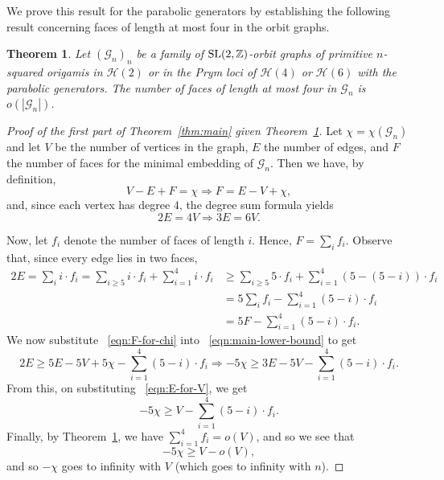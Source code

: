 \documentclass[a4paper,11pt]{amsart}
\numberwithin{equation}{section}
\numberwithin{figure}{section}
\numberwithin{table}{section}
\newtheorem{theorem}{Theorem}[section]
\newcommand{\calH}{\mathcal{H}}
\newcommand{\Z}{\mathbb{Z}}
\DeclareMathOperator{\SL}{{\rm{SL}}}
\begin{document}
We prove this result for the parabolic generators by establishing the following result concerning faces of length at most four in the orbit graphs.

\begin{theorem}\label{thm:submain-1}
    Let $(\mathcal{G}_{n})_{n}$ be a family of $\SL(2,\Z)$-orbit graphs of primitive $n$-squared origamis in $\calH(2)$ or in the Prym loci of $\calH(4)$ or $\calH(6)$ with the parabolic generators. The number of faces of length at most four in $\mathcal{G}_{n}$ is $o(|\mathcal{G}_{n}|)$.
\end{theorem}

\begin{proof}[Proof of the first part of Theorem~\ref{thm:main} given Theorem~\ref{thm:submain-1}]
    Let $\chi = \chi(\mathcal{G}_{n})$ and let $V$ be the number of vertices in the graph, $E$ the number of edges, and $F$ the number of faces for the minimal embedding of $\mathcal{G}_{n}$. Then we have, by definition,
    \begin{equation}\label{eqn:F-for-chi}
      V-E+F = \chi \Rightarrow F = E-V+\chi,
    \end{equation}
    and, since each vertex has degree $4$, the degree sum formula yields 
    \begin{equation}\label{eqn:E-for-V}
        2E = 4V \Rightarrow 3E = 6V.
    \end{equation}
    
    Now, let $f_{i}$ denote the number of faces of length $i$. Hence, $F = \sum_{i}f_{i}$. Observe that, since every edge lies in two faces,
    \begin{equation}
        \begin{split}
        2E = \sum_{i} i\cdot f_{i} = \sum_{i\geq 5}i\cdot f_{i} + \sum_{i=1}^{4} i \cdot f_{i} &\geq \sum_{i\geq 5}5\cdot f_{i} + \sum_{i=1}^{4} (5-(5-i)) \cdot f_{i} \\
        &= 5\sum_{i}f_{i} - \sum_{i = 1}^{4}(5-i)\cdot f_{i} \\
        &= 5F - \sum_{i = 1}^{4}(5-i)\cdot f_{i}. 
        \end{split} \label{eqn:main-lower-bound}
    \end{equation}
    We now substitute ~\eqref{eqn:F-for-chi} into ~\eqref{eqn:main-lower-bound} to get
    \[
        2E\geq 5E - 5V + 5\chi - \sum_{i = 1}^{4}(5-i)\cdot f_{i} \Rightarrow -5\chi \geq 3E - 5V - \sum_{i = 1}^{4}(5-i)\cdot f_{i}.
    \]
    From this, on substituting ~\eqref{eqn:E-for-V}, we get
    \[-5\chi \geq V - \sum_{i = 1}^{4}(5-i)\cdot f_{i}.\]
    Finally, by Theorem~\ref{thm:submain-1}, we have $\sum_{i=1}^{4}f_{i} = o(V)$, and so we see that
    \[-5\chi\geq V - o(V),\]
    and so $-\chi$ goes to infinity with $V$ (which goes to infinity with $n$).
\end{proof}
\end{document}
